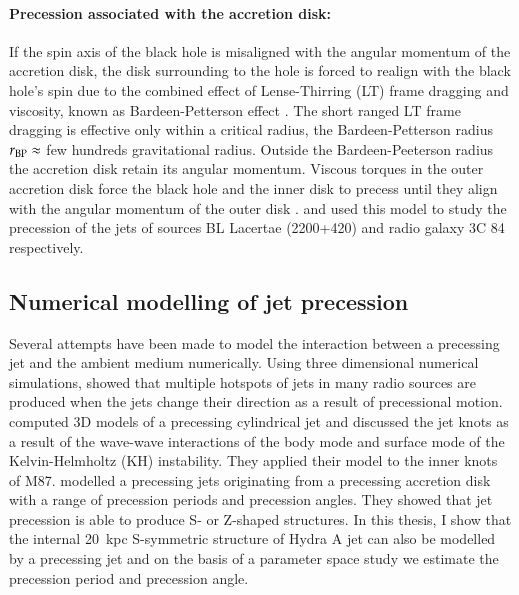 \paragraph{Precession associated with the accretion disk:}
If the spin axis of the black hole is misaligned with the angular momentum of the accretion disk, the disk surrounding to the hole is forced to realign with the black hole's spin due to the combined effect of Lense-Thirring (LT) frame dragging and viscosity, known as  Bardeen-Petterson effect \citep{bardeen75}. The short ranged LT frame dragging is effective only within a critical radius, the Bardeen-Petterson radius $r_{\rm BP}\approx$ few hundreds gravitational radius. Outside the Bardeen-Peeterson radius the accretion disk retain its angular momentum. Viscous torques in the outer accretion disk force the black hole and the inner disk to precess until they align with the angular momentum of the outer disk \citep{rees78, scheuer96, natarajan98, caproni07}. \citet{caproni07} and \citet{morales-teixeira12} used this model to study the precession of the jets of sources BL Lacertae (2200+420) and radio galaxy 3C 84 respectively. 

 \subsection{Numerical modelling of jet precession}
Several attempts have been made to model the interaction between a precessing jet and the ambient medium numerically. Using three dimensional numerical simulations, \citet{cox91} showed that multiple hotspots of jets in many radio sources are produced when the jets change their direction as a result of precessional motion. \citet{hardee01} computed 3D models of a precessing cylindrical jet and discussed the jet knots as a result of the wave-wave interactions of the body mode and surface mode of the Kelvin-Helmholtz (KH) instability. They applied their model to the inner knots of M87. \citet{kurosawa08} modelled a precessing jets originating from a precessing accretion disk with a range of precession periods and precession angles. They showed that jet precession is able to produce S- or Z-shaped structures. In this thesis, I show that the internal 20~kpc S-symmetric structure of Hydra A jet can also be modelled by a precessing jet and on the basis of a parameter space study we estimate the precession period and precession angle.


